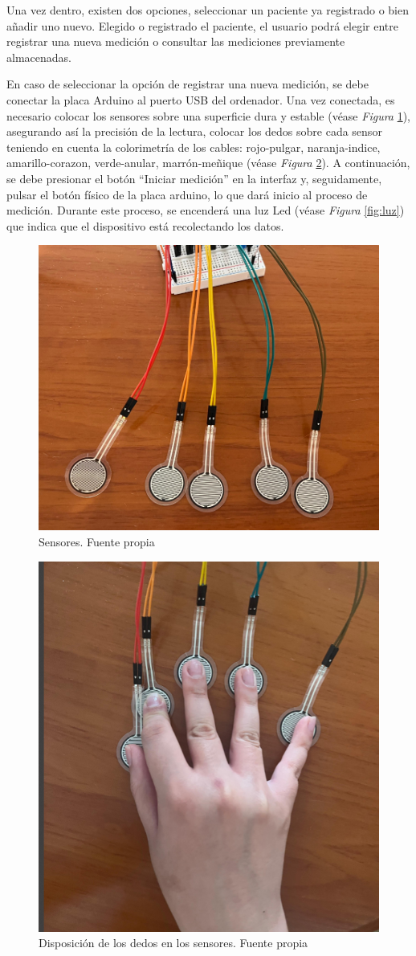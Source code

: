 Una vez dentro, existen dos opciones, seleccionar un paciente ya registrado o bien añadir uno nuevo. Elegido o registrado el paciente, el usuario podrá elegir entre registrar una nueva medición o consultar las mediciones previamente almacenadas.

En caso de seleccionar la opción de registrar una nueva medición, se debe conectar la placa Arduino al puerto USB del ordenador. Una vez conectada, es necesario colocar los sensores sobre una superficie dura y estable (véase \textit{Figura} \ref{fig:sensores_mesa}), asegurando así la precisión de la lectura, colocar los dedos sobre cada sensor teniendo en cuenta la colorimetría de los cables: rojo-pulgar, naranja-indice, amarillo-corazon, verde-anular, marrón-meñique (véase \textit{Figura} \ref{fig:sensor_mano}). A continuación, se debe presionar el botón “Iniciar medición” en la interfaz y, seguidamente, pulsar el botón físico de la placa arduino, lo que dará inicio al proceso de medición. Durante este proceso, se encenderá una luz Led (véase \textit{Figura} \ref{fig:luz}) que indica que el dispositivo está recolectando los datos.
\begin{figure}
    \centering
    \includegraphics[width=0.5\linewidth]{img/Sensores.png}
    \caption{Sensores. Fuente propia}
    \label{fig:sensores_mesa}
\end{figure}
\begin{figure}
    \centering
    \includegraphics[width=0.5\linewidth]{img/sensor_mano.png}
    \caption{Disposición de los dedos en los sensores. Fuente propia}
    \label{fig:sensor_mano}
\end{figure}
